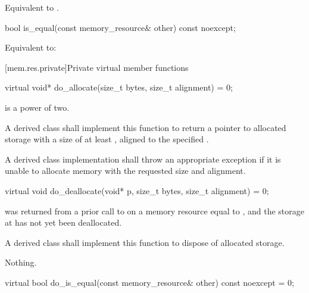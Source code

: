\begin{itemdescr}
\pnum
\effects
Equivalent to .
\end{itemdescr}

%
\begin{itemdecl}
bool is_equal(const memory_resource& other) const noexcept;
\end{itemdecl}

\begin{itemdescr}
\pnum
\effects
Equivalent to: 
\end{itemdescr}


[mem.res.private]{Private virtual member functions}

%
\begin{itemdecl}
virtual void* do_allocate(size_t bytes, size_t alignment) = 0;
\end{itemdecl}

\begin{itemdescr}
\pnum
\expects
{} is a power of two.

\pnum
\returns
A derived class shall implement this function to
return a pointer to allocated storage
with a size of at least ,
aligned to the specified .

\pnum
\throws
A derived class implementation shall throw an appropriate exception if it is unable to allocate memory with the requested size and alignment.
\end{itemdescr}

%
\begin{itemdecl}
virtual void do_deallocate(void* p, size_t bytes, size_t alignment) = 0;
\end{itemdecl}

\begin{itemdescr}
\pnum
\expects
{} was returned from a prior call to 
on a memory resource equal to ,
and the storage at  has not yet been deallocated.

\pnum
\effects
A derived class shall implement this function to dispose of allocated storage.

\pnum
\throws
Nothing.
\end{itemdescr}

%
\begin{itemdecl}
virtual bool do_is_equal(const memory_resource& other) const noexcept = 0;
\end{itemdecl}

